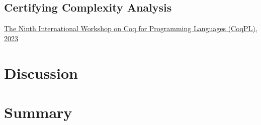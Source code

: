 \section{Certifying Complexity Analysis}\label{coqpl}
\ainfoX{\CTNT}
{\href{https://popl23.sigplan.org/home/CoqPL-2023}
{The Ninth International Workshop on Coq for Programming Languages (CoqPL), 2023}}
{\abspage{}}

\clearpage

\chapter{Discussion}\label{ch:discussion}


\chapter{Summary}\label{ch:summary}


\backmatter
\printbibliography[label=chap:references, title=References]
\let\printbibliography\relax

\appendix


